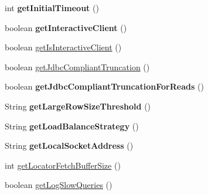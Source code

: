 \begin{DoxyCompactItemize}
int {\bfseries get\+Initial\+Timeout} ()
\item 
\mbox{\label{classcom_1_1mysql_1_1jdbc_1_1jdbc2_1_1optional_1_1_connection_wrapper_a591f798e0bcdbe0c2fcdee3fc97b109c}} 
boolean {\bfseries get\+Interactive\+Client} ()
\item 
boolean \mbox{\hyperlink{classcom_1_1mysql_1_1jdbc_1_1jdbc2_1_1optional_1_1_connection_wrapper_ae1fd8eb0bb01d247ca9db06d0fb3377f}{get\+Is\+Interactive\+Client}} ()
\item 
boolean \mbox{\hyperlink{classcom_1_1mysql_1_1jdbc_1_1jdbc2_1_1optional_1_1_connection_wrapper_a3daafc5194855212c6b6c0c30fb449b7}{get\+Jdbc\+Compliant\+Truncation}} ()
\item 
\mbox{\label{classcom_1_1mysql_1_1jdbc_1_1jdbc2_1_1optional_1_1_connection_wrapper_a2cfa94c10429283ff6547ef715085847}} 
boolean {\bfseries get\+Jdbc\+Compliant\+Truncation\+For\+Reads} ()
\item 
\mbox{\label{classcom_1_1mysql_1_1jdbc_1_1jdbc2_1_1optional_1_1_connection_wrapper_a4ccbeca436dbe31316da9193cc7585da}} 
String {\bfseries get\+Large\+Row\+Size\+Threshold} ()
\item 
\mbox{\label{classcom_1_1mysql_1_1jdbc_1_1jdbc2_1_1optional_1_1_connection_wrapper_a080f19a0b220068d1bc3e526f3194bea}} 
String {\bfseries get\+Load\+Balance\+Strategy} ()
\item 
\mbox{\label{classcom_1_1mysql_1_1jdbc_1_1jdbc2_1_1optional_1_1_connection_wrapper_ace0f7d238217a96d05be8d9044ffda53}} 
String {\bfseries get\+Local\+Socket\+Address} ()
\item 
int \mbox{\hyperlink{classcom_1_1mysql_1_1jdbc_1_1jdbc2_1_1optional_1_1_connection_wrapper_a4232a575ece7c1b11147d5947bd7404c}{get\+Locator\+Fetch\+Buffer\+Size}} ()
\item 
boolean \mbox{\hyperlink{classcom_1_1mysql_1_1jdbc_1_1jdbc2_1_1optional_1_1_connection_wrapper_ad4c40181a8ac4df23cc62cdfa67068ad}{get\+Log\+Slow\+Queries}} ()
\item 

\end{DoxyCompactItemize}
